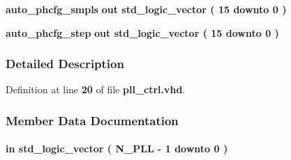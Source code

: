 \begin{DoxyCompactItemize}
\item 
{\bf auto\+\_\+phcfg\+\_\+smpls}  {\bfseries {\bfseries \textcolor{keywordflow}{out}\textcolor{vhdlchar}{ }}} {\bfseries \textcolor{comment}{std\+\_\+logic\+\_\+vector}\textcolor{vhdlchar}{ }\textcolor{vhdlchar}{(}\textcolor{vhdlchar}{ }\textcolor{vhdlchar}{ } \textcolor{vhdldigit}{15} \textcolor{vhdlchar}{ }\textcolor{keywordflow}{downto}\textcolor{vhdlchar}{ }\textcolor{vhdlchar}{ } \textcolor{vhdldigit}{0} \textcolor{vhdlchar}{ }\textcolor{vhdlchar}{)}\textcolor{vhdlchar}{ }} 
\item 
{\bf auto\+\_\+phcfg\+\_\+step}  {\bfseries {\bfseries \textcolor{keywordflow}{out}\textcolor{vhdlchar}{ }}} {\bfseries \textcolor{comment}{std\+\_\+logic\+\_\+vector}\textcolor{vhdlchar}{ }\textcolor{vhdlchar}{(}\textcolor{vhdlchar}{ }\textcolor{vhdlchar}{ } \textcolor{vhdldigit}{15} \textcolor{vhdlchar}{ }\textcolor{keywordflow}{downto}\textcolor{vhdlchar}{ }\textcolor{vhdlchar}{ } \textcolor{vhdldigit}{0} \textcolor{vhdlchar}{ }\textcolor{vhdlchar}{)}\textcolor{vhdlchar}{ }} 
\end{DoxyCompactItemize}


\subsubsection{Detailed Description}


Definition at line {\bf 20} of file {\bf pll\+\_\+ctrl.\+vhd}.



\subsubsection{Member Data Documentation}
\paragraph[{auto\+\_\+phcfg\+\_\+done}]{ {\bfseries \textcolor{keywordflow}{in}\textcolor{vhdlchar}{ }} {\bfseries \textcolor{comment}{std\+\_\+logic\+\_\+vector}\textcolor{vhdlchar}{ }\textcolor{vhdlchar}{(}\textcolor{vhdlchar}{ }\textcolor{vhdlchar}{ }\textcolor{vhdlchar}{ }\textcolor{vhdlchar}{ }{\bfseries {\bf N\+\_\+\+P\+LL}} \textcolor{vhdlchar}{-\/}\textcolor{vhdlchar}{ } \textcolor{vhdldigit}{1} \textcolor{vhdlchar}{ }\textcolor{keywordflow}{downto}\textcolor{vhdlchar}{ }\textcolor{vhdlchar}{ } \textcolor{vhdldigit}{0} \textcolor{vhdlchar}{ }\textcolor{vhdlchar}{)}\textcolor{vhdlchar}{ }} \hspace{0.3cm}{\ttfamily [Port]}}\label{classpll__ctrl_a629751d34531aad3c92724199e14ead2}


